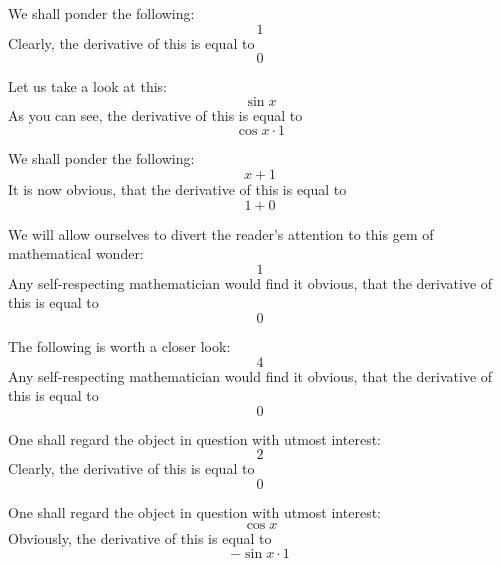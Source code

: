 \documentclass{article}
\begin{document}
We shall ponder the following:
\begin{equation}
1 
\end{equation}
Clearly, the derivative of this is equal to
\begin{equation}
0 
\end{equation}

Let us take a look at this:
\begin{equation}
\sin x 
\end{equation}
As you can see, the derivative of this is equal to
\begin{equation}
\cos x \cdot 1 
\end{equation}

We shall ponder the following:
\begin{equation}
x + 1 
\end{equation}
It is now obvious, that the derivative of this is equal to
\begin{equation}
1 + 0 
\end{equation}

We will allow ourselves to divert the reader's attention to this gem of mathematical wonder:
\begin{equation}
1 
\end{equation}
Any self-respecting mathematician would find it obvious, that the derivative of this is equal to
\begin{equation}
0 
\end{equation}

The following is worth a closer look:
\begin{equation}
4 
\end{equation}
Any self-respecting mathematician would find it obvious, that the derivative of this is equal to
\begin{equation}
0 
\end{equation}

One shall regard the object in question with utmost interest:
\begin{equation}
2 
\end{equation}
Clearly, the derivative of this is equal to
\begin{equation}
0 
\end{equation}

One shall regard the object in question with utmost interest:
\begin{equation}
\cos x 
\end{equation}
Obviously, the derivative of this is equal to
\begin{equation}
-\sin x \cdot 1 
\end{equation}
\end{document}
